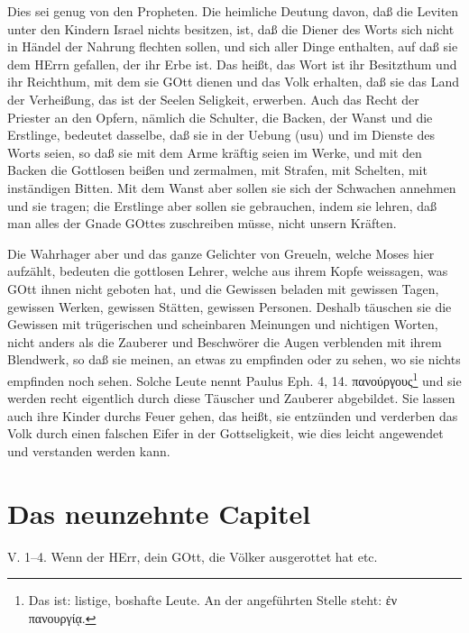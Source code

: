 Dies sei genug von den Propheten. Die heimliche Deutung davon, daß die Leviten unter den Kindern Israel nichts besitzen, ist, daß die Diener des Worts sich nicht in Händel der Nahrung flechten sollen, und sich aller Dinge enthalten, auf daß sie dem HErrn gefallen, der ihr Erbe ist. Das heißt, das Wort ist ihr Besitzthum und ihr Reichthum, mit dem sie GOtt dienen und das Volk erhalten, daß sie das Land der Verheißung, das ist der Seelen Seligkeit, erwerben. Auch das Recht der Priester an den Opfern, nämlich die Schulter, die Backen, der Wanst und die Erstlinge, bedeutet dasselbe, daß sie in der Uebung (usu) und im Dienste des Worts seien, so daß sie mit dem Arme kräftig seien im Werke, und mit den Backen die Gottlosen beißen und zermalmen, mit Strafen, mit Schelten, mit inständigen Bitten. Mit dem Wanst aber sollen sie sich der Schwachen annehmen und sie tragen; die Erstlinge aber sollen sie gebrauchen, indem sie lehren, daß man alles der Gnade GOttes zuschreiben müsse, nicht unsern Kräften.

Die Wahrhager aber und das ganze Gelichter von Greueln, welche Moses hier aufzählt, bedeuten die gottlosen Lehrer, welche aus ihrem Kopfe weissagen, was GOtt ihnen nicht geboten hat, und die Gewissen beladen mit gewissen Tagen, gewissen Werken, gewissen Stätten, gewissen Personen. Deshalb täuschen sie die Gewissen mit trügerischen und scheinbaren Meinungen und nichtigen Worten, nicht anders als die Zauberer und Beschwörer die Augen verblenden mit ihrem Blendwerk, so daß sie meinen, an etwas zu empfinden oder zu sehen, wo sie nichts empfinden noch sehen. Solche Leute nennt Paulus Eph. 4, 14. πανούργους\footnote{Das ist: listige, boshafte Leute. An der angeführten Stelle steht: ἐν πανουργίᾳ.} und sie werden recht eigentlich durch diese Täuscher und Zauberer abgebildet. Sie lassen auch ihre Kinder durchs Feuer gehen, das heißt, sie entzünden und verderben das Volk durch einen falschen Eifer in der Gottseligkeit, wie dies leicht angewendet und verstanden werden kann.

\section{Das neunzehnte Capitel}

\begin{schriftzitat}
V. 1–4. Wenn der HErr, dein GOtt, die Völker ausgerottet hat etc.
\end{schriftzitat}


